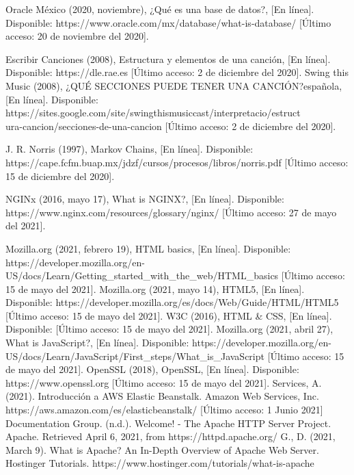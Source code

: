 \documentclass[12pt, a4paper, titlepage]{report}
\begin{document}
\begin{thebibliography}{20}
	Oracle México (2020, noviembre), ¿Qué es una base de datos?, [En línea]. Disponible: https://www.oracle.com/mx/database/what-is-database/ [Último acceso: 20 de noviembre del 2020].
	
	Escribir Canciones (2008), Estructura y elementos de una canción, [En línea]. Disponible: https://dle.rae.es [Último acceso: 2 de diciembre del 2020].
	Swing this Music (2008), ¿QUÉ SECCIONES PUEDE TENER UNA CANCIÓN?española, [En línea]. Disponible: https://sites.google.com/site/swingthismusiccast/interpretacio/estruct\\ura-cancion/secciones-de-una-cancion [Último acceso: 2 de diciembre del 2020].
	
	J. R. Norris (1997), Markov Chains, [En línea]. Disponible: https://cape.fcfm.buap.mx/jdzf/cursos/procesos/libros/norris.pdf [Último acceso: 15 de diciembre del 2020].
	
	NGINx (2016, mayo 17), What is NGINX?, [En línea]. Disponible: https://www.nginx.com/resources/glossary/nginx/ [Último acceso: 27 de mayo del 2021].
	
	
	Mozilla.org (2021, febrero 19), HTML basics, [En línea]. Disponible: https://developer.mozilla.org/en-US/docs/Learn/Getting\_started\_with\_the\_web/HTML\_basics [Último acceso: 15 de mayo del 2021].
	Mozilla.org (2021, mayo 14), HTML5, [En línea]. Disponible: https://developer.mozilla.org/es/docs/Web/Guide/HTML/HTML5 [Último acceso: 15 de mayo del 2021].
	W3C (2016), HTML \& CSS, [En línea]. Disponible: [Último acceso: 15 de mayo del 2021].
	Mozilla.org (2021, abril 27), What is JavaScript?, [En línea]. Disponible: https://developer.mozilla.org/en-US/docs/Learn/JavaScript/First\_steps/What\_is\_JavaScript [Último acceso: 15 de mayo del 2021].
	OpenSSL (2018), OpenSSL, [En línea]. Disponible: https://www.openssl.org [Último acceso: 15 de mayo del 2021].
	Services, A. (2021). Introducción a AWS Elastic Beanstalk. Amazon Web Services, Inc. https://aws.amazon.com/es/elasticbeanstalk/ [Último acceso: 1 Junio 2021]
	Documentation Group. (n.d.). Welcome! - The Apache HTTP Server Project. Apache. Retrieved April 6, 2021, from https://httpd.apache.org/
	G., D. (2021, March 9). What is Apache? An In-Depth Overview of Apache Web Server. Hostinger Tutorials. https://www.hostinger.com/tutorials/what-is-apache
	

\end{thebibliography}
\end{document}
